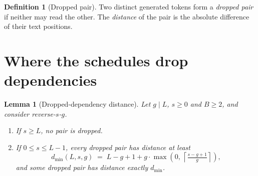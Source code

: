 \documentclass[11pt]{article}
\newtheorem{lemma}{Lemma}
\theoremstyle{definition}
\newtheorem{definition}{Definition}
\theoremstyle{remark}
\newcommand{\sch}[1]{\textsf{#1}}
\newcommand{\dmin}{d_{\min}}
\newcommand{\pos}[1]{\max\!\left(0,\,#1\right)}
\begin{document}
\begin{definition}[Dropped pair]
Two distinct generated tokens form a \emph{dropped pair} if neither may read the other.
The \emph{distance} of the pair is the absolute difference of their text positions.
\end{definition}

\section{Where the schedules drop dependencies}
\label{sec:lemma}

\begin{lemma}[Dropped-dependency distance]
\label{lem:distance}
Let $g\mid L$, $s\ge 0$ and $B\ge2$, and consider \sch{reverse-$s$-$g$}.
\begin{enumerate}
  \item[(a)] If $s\ge L$, no pair is dropped.
  \item[(b)] If $0\le s\le L-1$, every dropped pair has distance at least
  \begin{equation}
    \dmin(L,s,g) \;=\; L-g+1+g\cdot\pos{\left\lceil \tfrac{s-g+1}{g}\right\rceil},
    \label{eq:dmin}
  \end{equation}
  and some dropped pair has distance exactly $\dmin$.
\end{enumerate}
\end{lemma}
\end{document}
